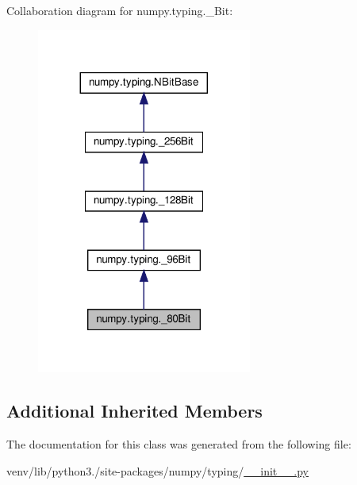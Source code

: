 Collaboration diagram for numpy.\+typing.\+\_\+Bit\+:
\nopagebreak
\begin{figure}[H]
\begin{center}
\leavevmode
\includegraphics[width=200pt]{classnumpy_1_1typing_1_1__80Bit__coll__graph}
\end{center}
\end{figure}
\subsection*{Additional Inherited Members}


The documentation for this class was generated from the following file\+:\begin{DoxyCompactItemize}
\item 
venv/lib/python3./site-\/packages/numpy/typing/\hyperlink{venv_2lib_2python3_89_2site-packages_2numpy_2typing_2____init_____8py}{\+\_\+\+\_\+init\+\_\+\+\_\+.\+py}\end{DoxyCompactItemize}
